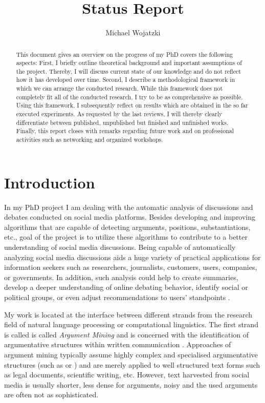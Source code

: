 \documentclass[11pt]{article}
\title{Status Report}
\author{Michael Wojatzki}
\date{}
\begin{document}
\maketitle
\begin{abstract}
This document gives an overview on the progress of my PhD covers the following aspects:
First, I briefly outline theoretical background and important assumptions of the project. 
Thereby, I will discuss current state of our knowledge and do not reflect how it has developed over time.
Second, I describe a methodological framework in which we can arrange the conducted research.
While this framework does not completely fit all of the conducted research, I try to be as comprehensive as possible.
Using this framework, I subsequently reflect on results which are obtained in the so far executed experiments.
As requested by the last reviews, I will thereby clearly differentiate between published, unpublished but finished and unfinished works. 
Finally, this report closes with remarks regarding future work and on professional activities such as networking and organized workshops.

\end{abstract}

\section{Introduction}

In my PhD project I am dealing with the automatic analysis of discussions and debates conducted on social media platforms.
Besides developing and improving algorithms that are capable of detecting arguments, positions, substantiations, etc., goal of the project is to utilize these algorithms to contribute to a better understanding of social media discussions.
Being capable of automatically analyzing social media discussions aids a huge variety of practical applications for information seekers such as researchers, journalists, customers, users, companies, or governments.
In addition, such analysis could help to create summaries, develop a deeper understanding of online debating behavior, identify social or political groups, or even adjust recommendations to users' standpoints \cite{anand2011cats,sridhar2014collective,boltuzic2014back}.

My work is located at the interface between different strands from the research field of natural language processing or computational linguistics.
The first strand is called is called \textit{Argument Mining} and is concerned with the identification of argumentative structures within written communication \cite{green2014argmining}.
Approaches of argument mining typically assume highly complex and specialised argumentative structures (such as  or ) and are merely applied to well structured text forms such as legal documents, scientific writing, etc.
However, text harvested from social media is usually shorter, less dense for arguments, noisy and the used arguments are often not as sophisticated.
\end{document}
